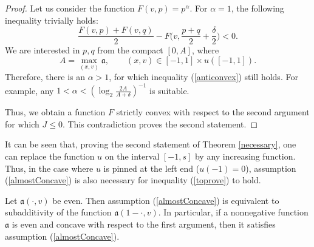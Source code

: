 \begin{proof}
Let us consider the function $F(v, p) = p ^ \alpha$.
For $\alpha = 1$, the following inequality trivially holds:
\begin{equation}
\label{anticonvex}
\frac{F(v, p) + F(v, q)}{ 2 } - F\big(v, \frac{p + q}{ 2 } + \frac{\delta}{ 2 }\big) <0.
\end{equation}
We are interested in $p, q$ from the compact $[0 , A]$,
where 
\begin{equation}
\label{weightMax}
A=\max \limits_{(x, v)} \mathfrak a,\qquad (x, v) \in [-1, 1 ] \times u([-1, 1] ).
\end{equation}
Therefore, there is an $\alpha> 1$, for which inequality (\ref{anticonvex})
still holds.
For example, any $1 < \alpha < (\log_2 \frac{ 2 A}{A + \delta})^{-1}$ is suitable.

Thus, we obtain a function $F$ strictly convex with respect to the second argument
for which $J \le 0$. This contradiction proves the second statement.
\end{proof}

\begin{rem}
\label{landesNecessary}
It can be seen that, proving the second statement of Theorem \ref{necessary},
one can replace the function $u$ on the interval $[-1, s]$ by any increasing function.
Thus, in the case where $u$ is pinned at the left end {\rm ($u(-1) = 0$)},
assumption (\ref{almostConcave}) is also necessary for inequality (\ref{toprove}) to hold.
\end{rem}

\begin{rem}
Let $\mathfrak a(\cdot, v)$ be even.
Then assumption (\ref{almostConcave}) is equivalent to subadditivity of the function $\mathfrak a(1 - \cdot, v)$.
In particular, if a nonnegative function $\mathfrak a$ is even and concave with respect to the first argument, then it satisfies assumption (\ref{almostConcave}).
\end{rem}
